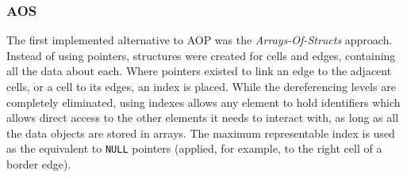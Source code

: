 \subsubsection{AOS}

The first implemented alternative to AOP was the \textit{Arrays-Of-Structs} approach. Instead of using pointers, structures were created for cells and edges, containing all the data about each. Where pointers existed to link an edge to the adjacent cells, or a cell to its edges, an index is placed. While the dereferencing levels are completely eliminated, using indexes allows any element to hold identifiers which allows direct access to the other elements it needs to interact with, as long as all the data objects are stored in arrays. The maximum representable index is used as the equivalent to \texttt{NULL} pointers (applied, for example, to the right cell of a border edge).